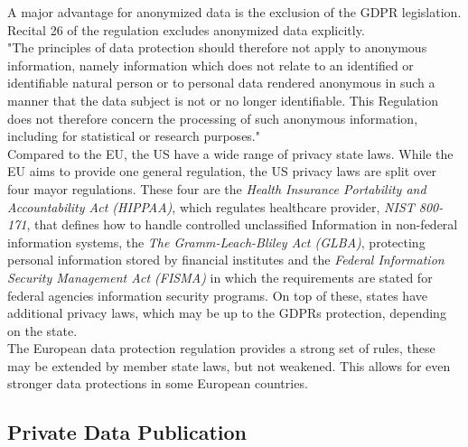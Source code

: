         A major advantage for anonymized data is the exclusion of the GDPR legislation. Recital 26 of the regulation excludes anonymized data explicitly.\\ 
        "The principles of data protection should therefore not apply to anonymous information, namely information which does not relate to an identified or identifiable natural person or to personal data rendered anonymous in such a manner that the data subject is not or no longer identifiable. This Regulation does not therefore concern the processing of such anonymous information, including for statistical or research purposes."\cite{european_union_regulation_2016}\\
        Compared to the EU, the US have a wide range of privacy state laws. While the EU aims to provide one general regulation, the US privacy laws are split over four mayor regulations.
        These four are the \textit{Health Insurance Portability and Accountability Act (HIPPAA)}\cite{rights_ocr_summary_2009}, which regulates healthcare provider, \textit{NIST 800-171}\cite{ross_protecting_2015}, that defines how to handle controlled unclassified Information in non-federal information systems, the \textit{The Gramm-Leach-Bliley Act (GLBA)}\cite{noauthor_gramm-leach-bliley_2013}, protecting personal information stored by financial institutes and the \textit{Federal Information Security Management Act (FISMA)}\cite{carper_s2521_2014} in which the requirements are stated for federal agencies information security programs. On top of these, states have additional privacy laws, which may be up to the GDPRs protection, depending on the state\cite{andrada_coos_eu_nodate}.\\
        The European data protection regulation provides a strong set of rules, these may be extended by member state laws, but not weakened. This allows for even stronger data protections in some European countries.
        
    \subsection{Private Data Publication}
        \label{subsec:related:private_data_analysis}
    
